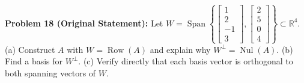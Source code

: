 \documentclass[11pt, letterpaper]{article}
\theoremstyle{definition}
\theoremstyle{remark}
\begin{document}
\medskip
\textbf{Problem 18 (Original Statement):} Let $W = \operatorname{Span}\left\{\begin{bmatrix} 1 \\ 2 \\ -1 \\ 3 \end{bmatrix}, \begin{bmatrix} 2 \\ 5 \\ 0 \\ 4 \end{bmatrix}\right\} \subset \mathbb{R}^4$. (a) Construct $A$ with $W = \operatorname{Row}(A)$ and explain why $W^{\perp} = \operatorname{Nul}(A)$. (b) Find a basis for $W^{\perp}$. (c) Verify directly that each basis vector is orthogonal to both spanning vectors of $W$.
\end{document}
